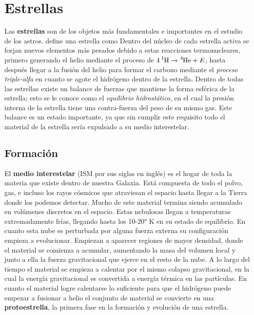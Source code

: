 \section{Estrellas}

Las \textbf{estrellas} son de los objetos más fundamentales e importantes en el
estudio de los astros. \citet*{anIntroStellarAstro::chapter1_basicConcepts}
define una estrella como  Dentro del núcleo de cada estrella activa se forjan nuevos elementos
más pesados debido a estas reacciones termonucleares, primero generando el helio
mediante el proceso de $\ce{4 ^1H} \rightarrow \ce{^4He} + E$, hasta después
llegar a la fusión del helio para formar el carbono mediante el \textit{proceso
triple-alfa} en cuanto se agote el hidrógeno dentro de la estrella. Dentro de
todas las estrellas existe un balance de fuerzas que mantiene la forma esférica
de la estrella; esto se le conoce como el \textit{equilibrio hidrostático}, en
el cual la presión interna de la estrella tiene una contra-fuerza del peso de su
mismo gas. Este balance es un estado importante, ya que sin cumplir este
requisito todo el material de la estrella sería expulsado a su medio
interestelar.

\subsection{Formación}


El \textbf{medio interestelar} (ISM por sus siglas en inglés) es el hogar de
toda la materia que existe dentro de nuestra Galaxia. Está compuesta de todo el
polvo, gas, e incluso los rayos cósmicos que atraviesan el espacio hasta llegar
a la Tierra donde los podemos detectar. Mucho de este material termina siendo
acumulado en volúmenes discretos en el espacio. Estas nebulosas llegan a
temperaturas extremadamente frías, llegando hasta los 10-20° K en su estado de
equilibrio. En cuanto esta nube es perturbada por alguna fuerza externa su
configuración empieza a evolucionar. Empiezan a aparecer regiones de mayor
densidad, donde el material se comienza a acumular, aumentando la masa del
volumen local y junto a ella la fuerza gravitacional que ejerce en el resto de
la nube. A lo largo del tiempo el material se empieza a calentar por el mismo
colapso gravitacional, en la cual la energía gravitacional es convertida a
energía térmica en las partículas. En cuanto el material logre calentarse lo
suficiente para que el hidrógeno puede empezar a fusionar a helio el conjunto de
material se convierte en una \textbf{protoestrella}, la primera fase en la
formación y evolución de una estrella.


